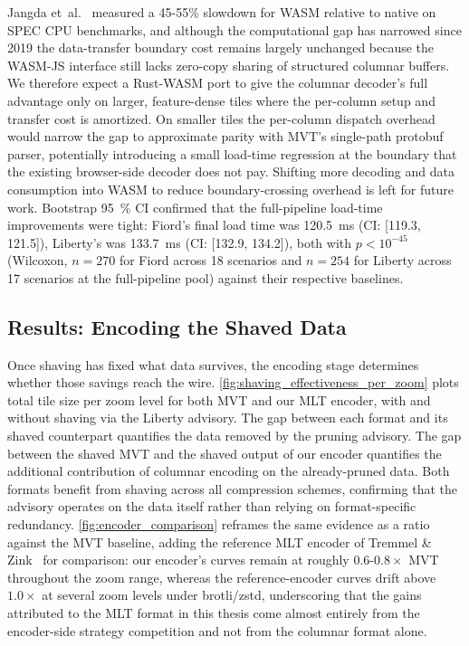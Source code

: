 Jangda et~al.~\cite{jangdaNotFastAnalyzing2019} measured a 45-55\% slowdown for \ac{WASM} relative to native on SPEC \ac{CPU} benchmarks, and although the computational gap has narrowed since 2019 the data-transfer boundary cost remains largely unchanged because the \ac{WASM}-JS interface still lacks zero-copy sharing of structured columnar buffers.
We therefore expect a Rust-\ac{WASM} port to give the columnar decoder's full advantage only on larger, feature-dense tiles where the per-column setup and transfer cost is amortized. On smaller tiles the per-column dispatch overhead would narrow the gap to approximate parity with \ac{MVT}'s single-path protobuf parser, potentially introducing a small load-time regression at the boundary that the existing browser-side decoder does not pay.
Shifting more decoding and data consumption into \ac{WASM} to reduce boundary-crossing overhead is left for future work.
Bootstrap \qty{95}{\percent} \ac{CI} confirmed that the full-pipeline load-time improvements were tight: Fiord's final load time was \qty{120.5}{\milli\second} (CI: [\num{119.3}, \num{121.5}]), Liberty's was \qty{133.7}{\milli\second} (CI: [\num{132.9}, \num{134.2}]), both with $p < 10^{-45}$ (Wilcoxon, $n = 270$ for Fiord across 18 scenarios and $n = 254$ for Liberty across 17 scenarios at the full-pipeline pool) against their respective baselines.


\subsection{Results: Encoding the Shaved Data}\label{sub:mlt_encoding_results}

Once shaving has fixed what data survives, the encoding stage determines whether those savings reach the wire.
\cref{fig:shaving_effectiveness_per_zoom} plots total tile size per zoom level for both \ac{MVT} and our \ac{MLT} encoder, with and without shaving via the Liberty advisory.
The gap between each format and its shaved counterpart quantifies the data removed by the pruning advisory.
The gap between the shaved \ac{MVT} and the shaved output of our encoder quantifies the additional contribution of columnar encoding on the already-pruned data.
Both formats benefit from shaving across all compression schemes, confirming that the advisory operates on the data itself rather than relying on format-specific redundancy.
\cref{fig:encoder_comparison} reframes the same evidence as a ratio against the \ac{MVT} baseline, adding the reference \ac{MLT} encoder of Tremmel \& Zink~\cite{tremmelMapLibreTileNext2025b} for comparison: our encoder's curves remain at roughly $0.6$-$0.8\times$ \ac{MVT} throughout the zoom range, whereas the reference-encoder curves drift above $1.0\times$ at several zoom levels under brotli/zstd, underscoring that the gains attributed to the \ac{MLT} format in this thesis come almost entirely from the encoder-side strategy competition and not from the columnar format alone.

